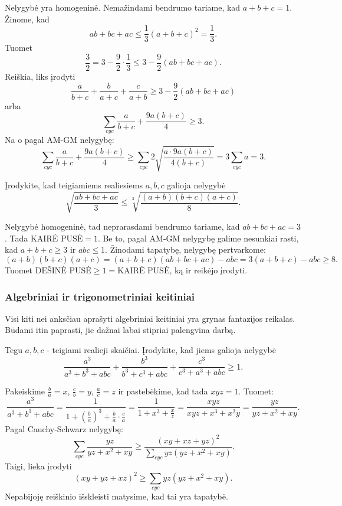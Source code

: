\begin{sprendimas}
  Nelygybė yra homogeninė. Nemažindami bendrumo tariame, kad $a+b+c=1$.
  Žinome, kad $$ab+bc+ac\leq\frac{1}{3}(a+b+c)^2=\frac{1}{3}.$$
  Tuomet
  $$\frac{3}{2}=3-\frac{9}{2}\cdot\frac{1}{3}\leq3-\frac{9}{2}(ab+bc+ac).$$
  Reiškia, liks įrodyti
  $$\frac{a}{b+c}+\frac{b}{a+c}+\frac{c}{a+b}\geq3-\frac{9}{2}(ab+bc+ac)$$
  arba $$\sum_{cyc}{\frac{a}{b+c}+\frac{9a(b+c)}{4}}\geq3.$$ Na o pagal
  AM-GM nelygybę:
  $$\sum_{cyc}{\frac{a}{b+c}+\frac{9a(b+c)}{4}}\geq\sum_{cyc}{2\sqrt{\frac{a\cdot9a(b+c)}{4(b+c)}}}=3\sum_{cyc}a=3.$$
\end{sprendimas}

\begin{pavnr}
  Įrodykite, kad teigiamiems realiesiems $a,b,c$ galioja nelygybė
  $$\sqrt{\frac{ab+bc+ac}{3}}\leq\sqrt[3]{\frac{(a+b)(b+c)(a+c)}{8}}.$$
\end{pavnr}

\begin{sprendimas}
  Nelygybė homogeninė, tad neprarasdami bendrumo tariame, kad $ab+bc+ac=3$.
  Tada $\text{KAIRĖ PUSĖ}=1$. Be to, pagal AM-GM nelygybę galime nesunkiai
  rasti, kad $a+b+c\geq3$ ir $abc\leq1$. Žinodami tapatybę, nelygybę
  pertvarkome: $$(a+b)(b+c)(a+c)=(a+b+c)(ab+bc+ac)-abc=3(a+b+c)-abc\geq8.$$
  Tuomet $\text{DEŠINĖ PUSĖ}\geq1=\text{KAIRĖ PUSĖ}$, ką ir reikėjo
  įrodyti.
\end{sprendimas}

\subsubsection{Algebriniai ir trigonometriniai keitiniai}

Visi kiti nei anksčiau aprašyti algebriniai keitiniai yra grynas fantazijos
reikalas. Būdami itin paprasti, jie dažnai labai stipriai palengvina darbą.

\begin{pavnr}
  Tegu $a,b,c$ - teigiami realieji skaičiai. Įrodykite, kad jiems galioja
  nelygybė
  $$\frac{a^3}{a^3+b^3+abc}+\frac{b^3}{b^3+c^3+abc}+\frac{c^3}{c^3+a^3+abc}\geq1.$$
\end{pavnr}

\begin{sprendimas}
  Pakeiskime $\frac{b}{a}=x$, $\frac{c}{b}=y$, $\frac{a}{c}=z$
  ir pastebėkime, kad tada $xyz=1$. Tuomet:
  $$\frac{a^3}{a^3+b^3+abc}=\frac{1}{1+\left(\frac{b}{a}\right)^3+\frac{b}{a}\cdot\frac{c}{a}}=\frac{1}{1+x^3+\frac{x}{z}}=\frac{xyz}{xyz+x^3+x^2y}=\frac{yz}{yz+x^2+xy}.$$
  Pagal Cauchy-Schwarz nelygybę:
  $$\sum_{cyc}{\frac{yz}{yz+x^2+xy}}\geq\frac{(xy+xz+yz)^2}{\sum\limits_{cyc}{yz(yz+x^2+xy)}}.$$
  Taigi, lieka įrodyti $$(xy+yz+xz)^2\geq\sum_{cyc}{yz(yz+x^2+xy)}.$$
  Nepabijoję reiškinio išskleisti matysime, kad tai yra tapatybė.
\end{sprendimas}

